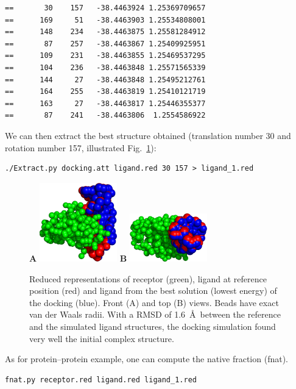 \documentclass[12pt,a4paper]{article}
\begin{document}
\begin{verbatim}
==       30    157   -38.4463924 1.25369709657
==      169     51   -38.4463903 1.25534808001
==      148    234   -38.4463875 1.25581284912
==       87    257   -38.4463867 1.25409925951
==      109    231   -38.4463855 1.25469537295
==      104    236   -38.4463848 1.25571565339
==      144     27   -38.4463848 1.25495212761
==      164    255   -38.4463819 1.25410121719
==      163     27   -38.4463817 1.25446355377
==       87    241   -38.4463806  1.2554586922
\end{verbatim}


We can then extract the best structure obtained (translation number 30 
and rotation number 157, illustrated Fig.~\ref{1K79_dock}):

\begin{verbatim}
./Extract.py docking.att ligand.red 30 157 > ligand_1.red
\end{verbatim}

\begin{figure}[htbp]
\center
{\textbf A}
\includegraphics*[width=0.30\textwidth]{img/1K79_dock1_front.png}
\hspace*{2cm}
{\textbf B}
\includegraphics*[width=0.30\textwidth]{img/1K79_dock1_top.png}
\caption{Reduced representations of receptor (green), ligand at reference 
position (red) and ligand from the best solution (lowest energy) of the 
docking (blue). Front (A) and top (B) views. Beads have exact van der Waals 
radii. With a RMSD of 1.6~\AA\ between the reference and the simulated ligand 
structures, the docking simulation found very well the initial complex 
structure.}
\label{1K79_dock}
\end{figure}

As for protein--protein example, one can compute the native fraction (fnat).
\begin{verbatim}
fnat.py receptor.red ligand.red ligand_1.red
\end{verbatim}
\end{document}
